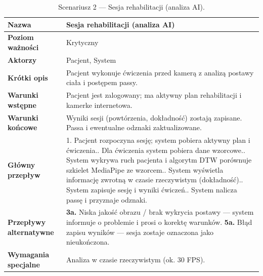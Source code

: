 \documentclass[11pt,a4paper]{article}
\begin{document}
\begin{table}[ht]
\small
\renewcommand{\arraystretch}{1.2}
\begin{tabularx}{\textwidth}{|>{\bfseries}p{}|Y|}
\hline
Nazwa & Sesja rehabilitacji (analiza AI) \\ \hline
Poziom ważności & Krytyczny \\ \hline
Aktorzy & Pacjent, System \\ \hline
Krótki opis & Pacjent wykonuje ćwiczenia przed kamerą z analizą postawy ciała i postępem passy. \\ \hline
Warunki wstępne & Pacjent jest zalogowany; ma aktywny plan rehabilitacji i kamerke internetowa. \\ \hline
Warunki końcowe & Wyniki sesji (powtórzenia, dokładność) zostają zapisane. Passa i ewentualne odznaki zaktualizowane. \\ \hline
Główny przepływ & 1. Pacjent rozpoczyna sesję; system pobiera aktywny plan i ćwiczenia.. Dla ćwiczenia system pobiera dane wzorcowe.. System wykrywa ruch pacjenta i algorytm DTW porównuje szkielet MediaPipe ze wzorcem.. System wyświetla informację zwrotną w czasie rzeczywistym (dokładność).. System zapisuje sesję i wyniki ćwiczeń.. System nalicza passę i przyznaje odznaki. \\ \hline
Przepływy alternatywne & \textbf{3a.} Niska jakość obrazu / brak wykrycia postawy — system informuje o problemie i prosi o korektę warunków.\newline
\textbf{5a.} Błąd zapisu wyników — sesja zostaje oznaczona jako nieukończona. \\ \hline
Wymagania specjalne & Analiza w czasie rzeczywistym (ok. 30 FPS). \\ \hline
\end{tabularx}
\caption{Scenariusz 2 — Sesja rehabilitacji (analiza AI).}
\end{table}
\FloatBarrier
\end{document}
